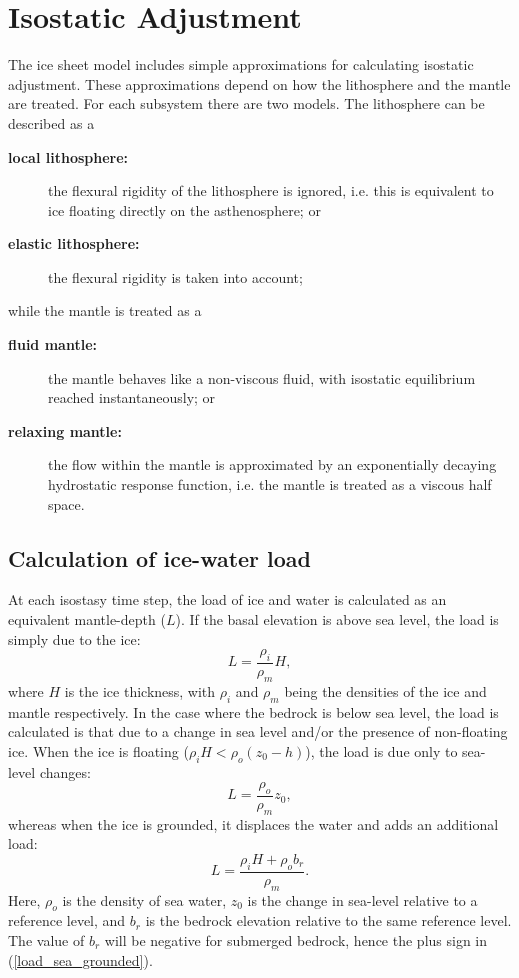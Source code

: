 \section{Isostatic Adjustment}
\label{sc:glide_isos}
The ice sheet model includes simple approximations for calculating isostatic adjustment. These approximations depend on how the lithosphere and the mantle are treated. For each subsystem there are two models. The lithosphere can be described as a
\begin{description}
\item[\textbf{local lithosphere:}] the flexural rigidity of the lithosphere is ignored, i.e. this is equivalent to ice floating directly on the asthenosphere; or
\item[\textbf{elastic lithosphere:}] the flexural rigidity is taken into account;
\end{description}
while the mantle is treated as a
\begin{description}
\item [\textbf{fluid mantle:}] the mantle behaves like a non-viscous fluid, with isostatic equilibrium reached instantaneously; or
\item [\textbf{relaxing mantle:}] the flow within the mantle is approximated by an exponentially decaying hydrostatic response function, i.e. the mantle is treated as a viscous half space.
\end{description}

\subsection{Calculation of ice-water load}
At each isostasy time step, the load of ice and water is calculated as an
equivalent mantle-depth ($L$). If the basal elevation is above sea level, the
load is simply due to the ice:
\begin{equation}
L=\frac{\rho_i}{\rho_m}H,
\label{load_land_ice}
\end{equation}
where $H$ is the ice thickness, with $\rho_i$ and $\rho_m$ being the densities
of the ice and mantle respectively. In the case where the bedrock is below
sea level, the load is calculated is that due to a change in sea level and/or
the presence of non-floating ice. When the ice is floating ($\rho_i
H<\rho_o(z_0-h)$), the load is due only to sea-level changes:
\begin{equation}
L=\frac{\rho_o}{\rho_m}z_0,
\label{load_sea_float}
\end{equation}
whereas when the ice is grounded, it displaces the water and adds an
additional load:
\begin{equation}
L=\frac{\rho_i H+\rho_o b_r}{\rho_m}.
\label{load_sea_grounded}
\end{equation}
Here, $\rho_o$ is the density of sea water, $z_0$ is the change in sea-level
relative to a reference level, and $b_r$ is the bedrock elevation relative to the
same reference level. The value of $b_r$ will be negative for submerged bedrock,
hence the plus sign in (\ref{load_sea_grounded}).

